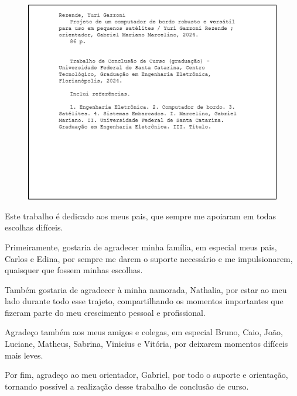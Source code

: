 \documentclass[
12pt,				%
oneside,			%
a4paper,			%
chapter=TITLE,		%
section=TITLE,		%
english,			%
brazil				%
hyperref=hidelinks]{abntex2}
\begin{document}
\imprimircapa

\imprimirfolhaderosto

\newpage
\null
\vfill
\begin{figure}[H]
    \centering
    \includegraphics[width=0.8\linewidth]{images/ficha-catalografica.png}
\end{figure}


\begin{folhadeaprovacao}
\end{folhadeaprovacao}

\begin{dedicatoria}
    Este trabalho é dedicado aos meus pais, que sempre me apoiaram em todas escolhas difíceis.
\end{dedicatoria}

\begin{agradecimentos}
	Primeiramente, gostaria de agradecer minha família, em especial meus pais, Carlos e Edina, por sempre me darem o suporte necessário e me impulsionarem, quaisquer que fossem minhas escolhas.

	Também gostaria de agradecer à minha namorada, Nathalia, por estar ao meu lado durante todo esse trajeto, compartilhando os momentos importantes que fizeram parte do meu crescimento pessoal e profissional.

	Agradeço também aos meus amigos e colegas, em especial Bruno, Caio, João, Luciane, Matheus, Sabrina, Vinicius e Vitória, por deixarem momentos difíceis mais leves.

	Por fim, agradeço ao meu orientador, Gabriel, por todo o suporte e orientação, tornando possível a realização desse trabalho de conclusão de curso.
	
\end{agradecimentos}
\end{document}
